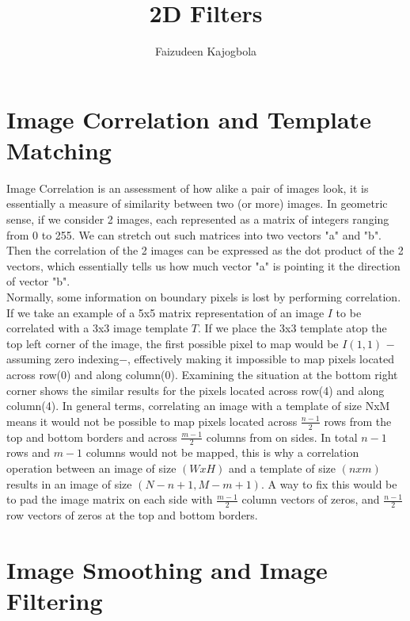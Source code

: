 \documentclass[a4paper]{article}
\title{\Huge{2D Filters}}
\author{Faizudeen Kajogbola}
\date{} %
\begin{document}
\maketitle

\setlength{\headsep}{5pt}


\section{Image Correlation and Template Matching}

Image Correlation is an assessment of how alike a pair of images look, 
it is essentially a measure of similarity between two (or more) images. 
In geometric sense, if we consider 2 images, each represented as a matrix of integers ranging from 0 to 255. 
We can stretch out such matrices into two vectors "a" and "b". 
Then the correlation of the 2 images can be expressed as the dot product of the 2 vectors, 
which essentially tells us how much vector "a" is pointing it the direction of vector "b".  \\

Normally, some information on boundary pixels is lost by performing correlation. 
If we take an example of a 5x5 matrix representation of an image $I$ to be correlated with a 3x3 image template $T$. 
If we place the 3x3 template atop the top left corner of the image, the first possible pixel to map would be $I(1,1)$
$-$ assuming zero indexing$-$, effectively making it impossible to map pixels located across row(0) and along column(0). 
Examining the situation at the bottom right corner shows the similar results for the pixels located across row(4) and along column(4). 
In general terms, correlating an image with a template of size NxM means it would not be possible to map pixels located across $\frac{n-1}{2}$ rows 
from the top and bottom borders and across $\frac{m-1}{2}$ columns from on sides. 
In total $n-1$ rows and $m-1$ columns would not be mapped, this is why a correlation operation between an image of size $(WxH)$ 
and a template of size $(nxm)$ results in an image of size $(N-n+1, M-m+1)$. 
A way to fix this would be to pad the image matrix on each side with $\frac{m-1}{2}$ column vectors of zeros, and $\frac{n-1}{2}$ row vectors of 
zeros at the top and bottom borders. \\


\section{Image Smoothing and Image Filtering}
\end{document}
